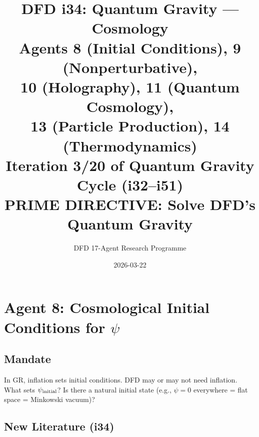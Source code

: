 \documentclass[11pt,a4paper]{article}
\title{DFD i34: Quantum Gravity --- Cosmology\\[6pt]
\large Agents 8 (Initial Conditions), 9 (Nonperturbative),\\
10 (Holography), 11 (Quantum Cosmology),\\
13 (Particle Production), 14 (Thermodynamics)\\[6pt]
\normalsize Iteration 3/20 of Quantum Gravity Cycle (i32--i51)\\
PRIME DIRECTIVE: Solve DFD's Quantum Gravity}
\author{DFD 17-Agent Research Programme}
\date{2026-03-22}
\begin{document}
\maketitle
\tableofcontents
\newpage

\section{Agent 8: Cosmological Initial Conditions for $\psi$}
\label{sec:agent8}

\subsection{Mandate}

In GR, inflation sets initial conditions. DFD may or may not need inflation. What sets $\psi_{\rm initial}$? Is there a natural initial state (e.g., $\psi = 0$ everywhere = flat space = Minkowski vacuum)?

\subsection{New Literature (i34)}
\end{document}

